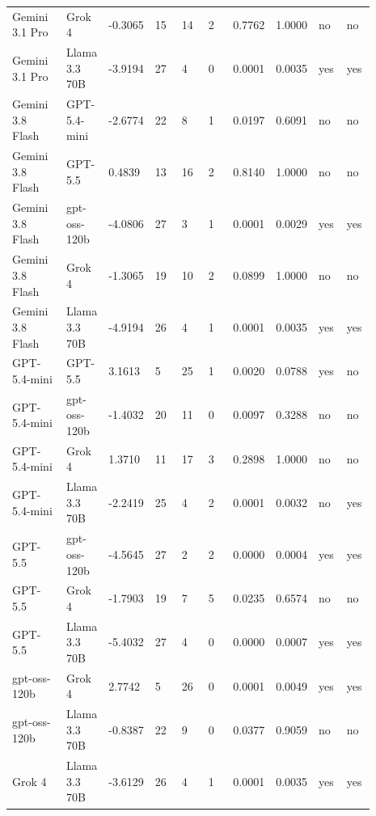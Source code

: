 \begin{landscape}
\begin{longtable}{p{0.162\linewidth}p{0.081\linewidth}p{0.081\linewidth}p{0.081\linewidth}p{0.081\linewidth}p{0.081\linewidth}p{0.081\linewidth}p{0.081\linewidth}p{0.081\linewidth}p{0.081\linewidth}}
Gemini 3.1 Pro & Grok 4 & -0.3065 & 15 & 14 & 2 & 0.7762 & 1.0000 & no & no \\
Gemini 3.1 Pro & Llama 3.3 70B & -3.9194 & 27 & 4 & 0 & 0.0001 & 0.0035 & yes & yes \\
Gemini 3.8 Flash & GPT-5.4-mini & -2.6774 & 22 & 8 & 1 & 0.0197 & 0.6091 & no & no \\
Gemini 3.8 Flash & GPT-5.5 & 0.4839 & 13 & 16 & 2 & 0.8140 & 1.0000 & no & no \\
Gemini 3.8 Flash & gpt-oss-120b & -4.0806 & 27 & 3 & 1 & 0.0001 & 0.0029 & yes & yes \\
Gemini 3.8 Flash & Grok 4 & -1.3065 & 19 & 10 & 2 & 0.0899 & 1.0000 & no & no \\
Gemini 3.8 Flash & Llama 3.3 70B & -4.9194 & 26 & 4 & 1 & 0.0001 & 0.0035 & yes & yes \\
GPT-5.4-mini & GPT-5.5 & 3.1613 & 5 & 25 & 1 & 0.0020 & 0.0788 & yes & no \\
GPT-5.4-mini & gpt-oss-120b & -1.4032 & 20 & 11 & 0 & 0.0097 & 0.3288 & no & no \\
GPT-5.4-mini & Grok 4 & 1.3710 & 11 & 17 & 3 & 0.2898 & 1.0000 & no & no \\
GPT-5.4-mini & Llama 3.3 70B & -2.2419 & 25 & 4 & 2 & 0.0001 & 0.0032 & no & yes \\
GPT-5.5 & gpt-oss-120b & -4.5645 & 27 & 2 & 2 & 0.0000 & 0.0004 & yes & yes \\
GPT-5.5 & Grok 4 & -1.7903 & 19 & 7 & 5 & 0.0235 & 0.6574 & no & no \\
GPT-5.5 & Llama 3.3 70B & -5.4032 & 27 & 4 & 0 & 0.0000 & 0.0007 & yes & yes \\
gpt-oss-120b & Grok 4 & 2.7742 & 5 & 26 & 0 & 0.0001 & 0.0049 & yes & yes \\
gpt-oss-120b & Llama 3.3 70B & -0.8387 & 22 & 9 & 0 & 0.0377 & 0.9059 & no & no \\
Grok 4 & Llama 3.3 70B & -3.6129 & 26 & 4 & 1 & 0.0001 & 0.0035 & yes & yes \\
\bottomrule
\end{longtable}
\normalsize
\end{landscape}
